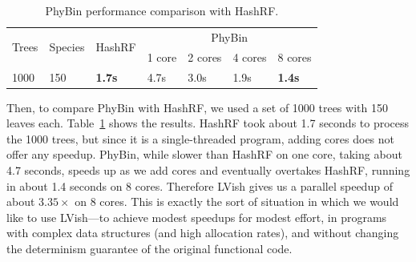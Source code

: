 \begin{table}
\begin{tabularx}{\textwidth}{XXXXXXX}
\multirow{2}{*}{Trees} & \multirow{2}{*}{Species} & \multirow{2}{*}{HashRF} & \multicolumn{4}{c}{PhyBin}                \\
                       &                          &                         & 1 core & 2 cores & 4 cores & 8 cores      \\ \hline
1000                   & 150                      & \textbf{1.7s}           & 4.7s   & 3.0s    & 1.9s    & \textbf{1.4s}
\end{tabularx}
\caption{PhyBin performance comparison with HashRF.}
\label{t:phybin-bench-hashrf}
\end{table}

Then, to compare PhyBin with HashRF, we used a set of 1000 trees with
150 leaves each.  Table~\ref{t:phybin-bench-hashrf} shows the results.
HashRF took about 1.7 seconds to process the 1000 trees, but since it
is a single-threaded program, adding cores does not offer any speedup.
PhyBin, while slower than HashRF on one core, taking about 4.7
seconds, speeds up as we add cores and eventually overtakes HashRF,
running in about 1.4 seconds on 8 cores.  Therefore LVish gives us a
parallel speedup of about $3.35\times$ on 8 cores.  This is exactly
the sort of situation in which we would like to use LVish---to achieve
modest speedups for modest effort, in programs with complex data
structures (and high allocation rates), and without changing the
determinism guarantee of the original functional code.
